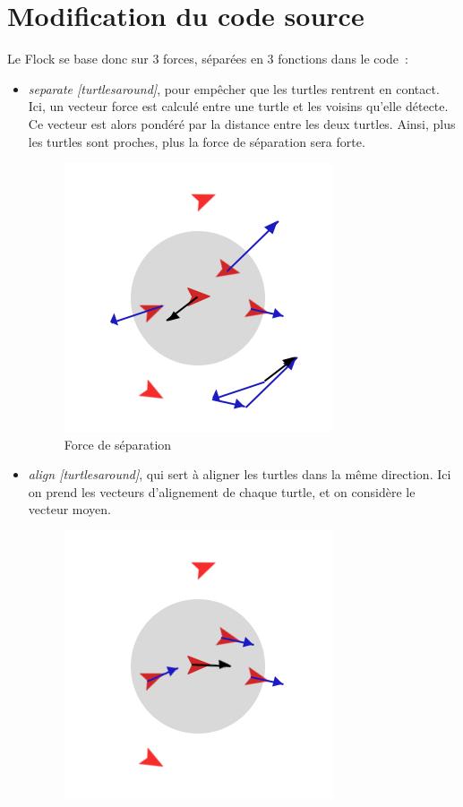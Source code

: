 \documentclass{article}
\begin{document}
\section{Modification du code source}

Le Flock se base donc sur 3 forces, séparées en 3 fonctions dans le code~:
\begin{itemize}
  \item \emph{separate [turtlesaround]}, pour empêcher que les turtles rentrent en contact. Ici, un vecteur force est calculé entre une turtle et les voisins qu'elle détecte. Ce vecteur est alors pondéré par la distance entre les deux turtles. Ainsi, plus les turtles sont proches, plus la force de séparation sera forte.
  \begin{figure}[h]
  	\begin{center}
  		\includegraphics[scale=0.3]{img/separate}
  		\caption{Force de séparation}
  		\label{fig:separate}
  	\end{center}
  \end{figure}
  \item \emph{align [turtlesaround]}, qui sert à aligner les turtles dans la même direction. Ici on prend les vecteurs d'alignement de chaque turtle, et on considère le vecteur moyen.
  \begin{figure}[h]
  	\begin{center}
  		\includegraphics[scale=0.3]{img/align}

\end{center}
\end{figure}
\end{itemize}
\end{document}
